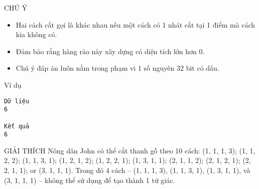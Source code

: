 CHÚ Ý
\begin{itemize}
	\item     Hai cách cắt gọi là khác nhau nếu một cách có 1 nhát cắt tại 1     điểm mà cách kia không có.   
	\item     Đảm bảo rằng hàng rào này xây dựng có diện tích lớn hơn 0.   
	\item     Chú ý đáp án luôn nằm trong phạm vi 1 số nguyên 32 bit có dấu.   
\end{itemize}
Ví dụ
\begin{verbatim}
Dữ liệu
6

Kết quả
6
\end{verbatim}
GIẢI THÍCH
Nông dân John có thể cắt thanh gỗ theo 10 cách: (1, 1, 1, 3); (1, 1, 2, 2); (1, 1, 3, 1); (1, 2, 1, 2); (1, 2, 2, 1); (1, 3, 1, 1); (2, 1, 1, 2); (2, 1, 2, 1); (2, 2, 1, 1); or (3, 1, 1, 1). Trong đó 4 cách -- (1, 1, 1, 3), (1, 1, 3, 1), (1, 3, 1, 1), và (3, 1, 1, 1) -- không thể sử dụng để tạo thành 1 tứ giác.